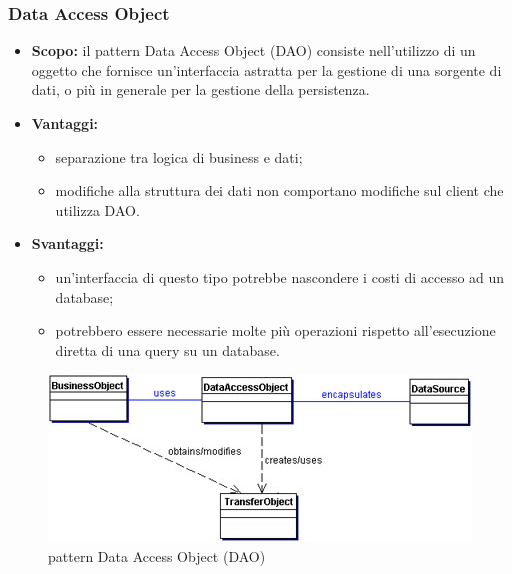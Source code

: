     \newpage
   \subsubsection{Data Access Object}
      \begin{itemize}
       \item \textbf{Scopo:} il pattern Data Access Object (DAO) consiste nell'utilizzo di un oggetto che fornisce un'interfaccia astratta per la gestione di una sorgente di dati, o più in generale per la gestione della persistenza.
	\item \textbf{Vantaggi:}
	  \begin{itemize}
	   \item separazione tra logica di business e dati;
	   \item modifiche alla struttura dei dati non comportano modifiche sul client che utilizza DAO.
	  \end{itemize}
	\item \textbf{Svantaggi:}
	  \begin{itemize}
	   \item un'interfaccia di questo tipo potrebbe nascondere i costi di accesso ad un database;
	   \item potrebbero essere necessarie molte più operazioni rispetto all'esecuzione diretta di una query su un database.
	  \end{itemize}
	\end{itemize}
	\begin{figure}[h]
		\centering
		\includegraphics[width=\textwidth,height=\textheight,keepaspectratio,scale=0.1]{images/DAOpattern.jpg}
		\caption{pattern Data Access Object (DAO)}\label{fig:dao1}
	\end{figure}
		\newpage
